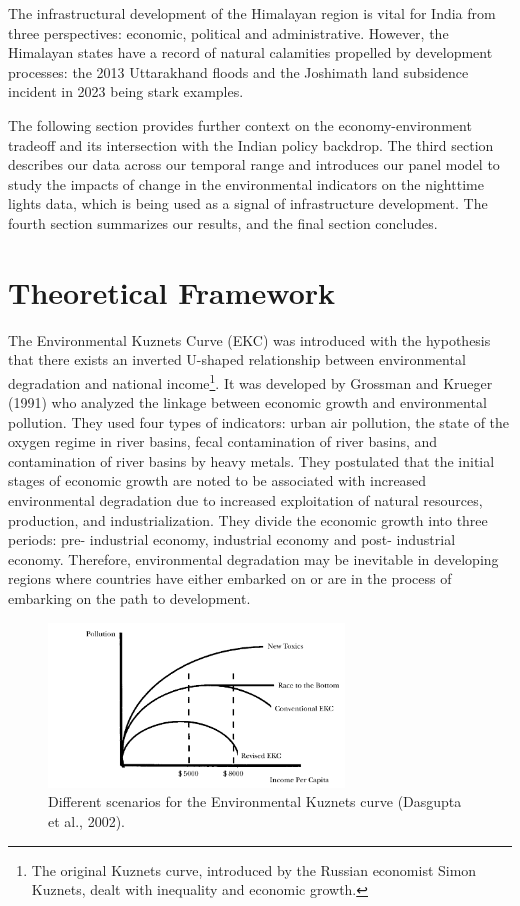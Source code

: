 \documentclass{article}
\begin{document}
The infrastructural development of the Himalayan region is vital for India from three perspectives: economic, political and administrative. However, the Himalayan states have a record of natural calamities propelled by development processes: the 2013 Uttarakhand floods and the Joshimath land subsidence incident in 2023 being stark examples. 

The following section provides further context on the economy-environment tradeoff and its intersection with the Indian policy backdrop. The third section describes our data across our temporal range and introduces our panel model to study the impacts of change in the environmental indicators on the nighttime lights data, which is being used as a signal of infrastructure development. The fourth section summarizes our results, and the final section concludes.


\section{Theoretical Framework}
The Environmental Kuznets Curve (EKC) was introduced with the hypothesis that there exists an inverted U-shaped relationship between environmental degradation and national income\footnote[2]{The original Kuznets curve, introduced by the Russian economist Simon Kuznets, dealt with inequality and economic growth.}. It was developed by Grossman and Krueger (1991) who analyzed the linkage between economic growth and environmental pollution. They used four types of indicators: urban air pollution, the state of the oxygen regime in river basins, fecal contamination of river basins, and contamination of river basins by heavy metals. They postulated that the initial stages of economic growth are noted to be associated with increased environmental degradation due to increased exploitation of natural resources, production, and industrialization. They divide the economic growth into three periods: pre- industrial economy, industrial economy and post- industrial economy. Therefore, environmental degradation may be inevitable in developing regions where countries have either embarked on or are in the process of embarking on the path to development.

\begin{figure}[h]
    \centering
    \includegraphics[width=0.7\textwidth]{images/kuznets_scen.png}
    \caption{Different scenarios for the Environmental Kuznets curve (Dasgupta et al., 2002).}
\end{figure}
\end{document}
